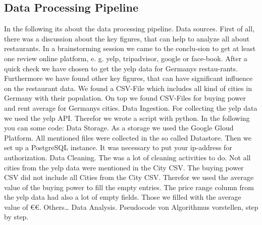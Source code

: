 \subsection{Data Processing Pipeline}
\label{subsec:pipeline}

In the following its about the data processing pipeline.
Data sources. First of all, there was a discussion about the key figures, that can help to analyze all about restaurants. In a brainstorming session we came to the conclu-sion to get at least one review online platform, e. g. yelp, tripadvisor, google or face-book. After a quick check we have chosen to get the yelp data for Germanys restau-rants.
Furthermore we have found other key figures, that can have significant influence on the restaurant data. We found a CSV-File which includes all kind of cities in Germany with their population. On top we found CSV-Files for buying power and rent average for Germanys cities.
Data Ingestion. For collecting the yelp data we used the yelp API. Therefor we wrote a script with python. In the following you can some code:
Data Storage. As a storage we used the Google Gloud Platform. All mentioned files were collected in the so called Datastore. Then we set up a PostgreSQL instance. It was necessary to put your ip-address for authorization.
Data Cleaning. The was a lot of cleaning activities to do. Not all cities from the yelp data were mentioned in the City CSV.
The buying power CSV did not include all Cities from the City CSV. Therefor we used the average value of the buying power to fill the empty entries.
The price range column from the yelp data had also a lot of empty fields. Those we filled with the average value of \euro\euro.
Others…
Data Analysis. Pseudocode von Algorithmus vorstellen, step by step.

